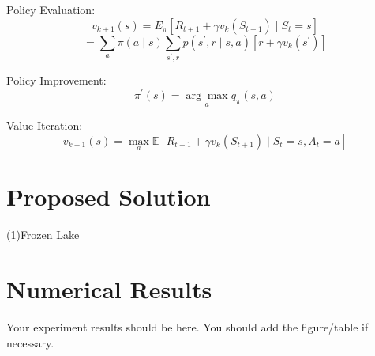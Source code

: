 \documentclass{article}
\theoremstyle{plain}
\theoremstyle{definition}
\theoremstyle{remark}
\begin{document}
Policy Evaluation:
$$v_{k+1}(s)={E}_{\pi} \left[R_{t+1}+\gamma v_{k}\left(S_{t+1}\right) \mid S_{t}=s\right]$$
$$=\sum_{a} \pi(a \mid s) \sum_{s^{\prime}, r} 
p\left(s^{\prime}, r \mid s, a\right)\left[r+\gamma v_{k}\left(s^{\prime}\right)\right]$$

Policy Improvement:
$$\pi^{\prime}(s)=\underset{a}{\arg \max} q_{\pi}(s, a)$$

Value Iteration:
$$v_{k+1}(s)=\max_{a} \mathbb{E} \left[R_{t+1}+\gamma v_{k}\left(S_{t+1}\right) \mid S_{t}=s, A_{t}=a\right]$$


\section{Proposed Solution}

(1)Frozen Lake


\section{Numerical Results}

Your experiment results should be here. You should add the figure/table if necessary.





\end{document}
